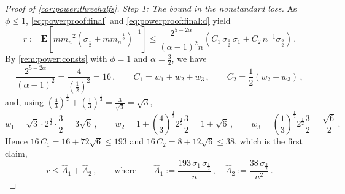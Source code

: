 \documentclass{article}
\newcommand{\lab}{\left[} %
\newcommand{\rab}{\right]} %
\newcommand{\ab}[1]{\lab #1 \rab} %
\newcommand{\abOf}[1]{\!\ab{#1}} %
\newcommand{\lb}{\left(} %
\newcommand{\rb}{\right)} %
\newcommand{\br}[1]{\lb #1 \rb} %
\newcommand{\E}{\mathbf{E}} %
\newcommand{\EOf}[1]{\E\abOf{#1}}
\newcommand{\eqcm}{\,,} %
\newcommand{\eqfs}{\,.}
\newcommand{\ol}[2]{\overline{#1#2}}
\begin{document}
\begin{proof}[Proof of \cref{cor:power:threehalfs}]
    \emph{Step 1: The bound in the nonstandard loss.}
    As $\phi \leq 1$, \eqref{eq:powerproof:final} and \eqref{eq:powerproof:final:d} yield
    \begin{equation}
        r
        :=
        \EOf{\ol{m}{m_n}^2 \br{\sigma_{\frac12} + \ol{m}{m_n}^{\frac12}}^{-1}}
        \leq
        \frac{2^{5-2\alpha}}{(\alpha-1)^2 n}
        \br{C_1\, \sigma_{\frac12}\, \sigma_1 + C_2\, n^{-1} \sigma_{\frac32}}
        \eqfs
    \end{equation}
    By \cref{rem:power:consts} with $\phi = 1$ and $\alpha = \frac32$, we have
    \begin{equation}
        \frac{2^{5-2\alpha}}{(\alpha-1)^2} = \frac{4}{\br{\frac12}^2} = 16
        \eqcm\qquad
        C_1 = w_1+w_2+w_3
        \eqcm\qquad
        C_2 = \frac12\br{w_2+w_3}
        \eqcm
    \end{equation}
    and, using $\br{\frac43}^{\frac12} + \br{\frac13}^{\frac12} = \frac{3}{\sqrt3} = \sqrt3$,
    \begin{equation}
        w_1 = \sqrt3 \cdot 2^{\frac32} \cdot \frac32 = 3\sqrt6
        \eqcm\qquad
        w_2 = 1 + \br{\frac43}^{\frac12} 2^{\frac12} \frac32 = 1 + \sqrt6
        \eqcm\qquad
        w_3 = \br{\frac13}^{\frac12} 2^{\frac12} \frac32 = \frac{\sqrt6}{2}
        \eqfs
    \end{equation}
    Hence $16\,C_1 = 16 + 72\sqrt6 \leq 193$ and $16\,C_2 = 8 + 12\sqrt6 \leq 38$, which is the first claim,
    \begin{equation}\label{eq:cor:threehalfs:r}
        r
        \leq
        \hat A_1 + \hat A_2
        \eqcm\qquad\text{where}\qquad
        \hat A_1 := \frac{193\, \sigma_1\, \sigma_{\frac12}}{n}
        \eqcm\quad
        \hat A_2 := \frac{38\, \sigma_{\frac32}}{n^2}
        \eqfs
    \end{equation}
    

\end{proof}
\end{document}
